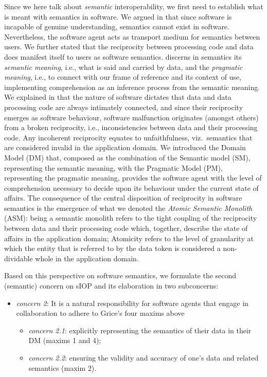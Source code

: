 \documentclass[sort&compress,preprint,authoryear,3p,twocolumn]{elsarticle}
\providecommand{\tightlist}{%
  \setlength{\itemsep}{0pt}\setlength{\parskip}{0pt}}
\begin{document}
Since we here talk about \emph{semantic} interoperability, we first need
to establish what is meant with semantics in software. We argued in
\citep{Brandt2021a} that since software is incapable of genuine
understanding, semantics cannot exist in software. Nevertheless, the
software agent acts as transport medium for semantics between users. We
further stated that the reciprocity between processing code and data
does manifest itself to users as software semantics.
\citep{Grice:1991BT} discerns in semantics its \emph{semantic meaning},
i.e., what is said and carried by data, and the \emph{pragmatic
meaning}, i.e., to connect with our frame of reference and its context
of use, implementing comprehension as an inference process from the
semantic meaning. We explained in \citep{Brandt2021a} that the nature of
software dictates that data and data processing code are always
intimately connected, and since their reciprocity emerges as software
behaviour, software malfunction originates (amongst others) from a
broken reciprocity, i.e., inconsistencies between data and their
processing code. Any incoherent reciprocity equates to unfaithfulness,
viz.~semantics that are considered invalid in the application domain. We
introduced the Domain Model (DM) that, composed as the combination of
the Semantic model (SM), representing the semantic meaning, with the
Pragmatic Model (PM), representing the pragmatic meaning, provides the
software agent with the level of comprehension necessary to decide upon
its behaviour under the current state of affairs. The consequence of the
central disposition of reciprocity in software semantics is the
emergence of what we denoted the \emph{Atomic Semantic Monolith} (ASM):
being a semantic monolith refers to the tight coupling of the
reciprocity between data and their processing code which, together,
describe the state of affairs in the application domain; Atomicity
refers to the level of granularity at which the entity that is referred
to by the data token is considered a non-dividable whole in the
application domain.

Based on this perspective on software semantics, we formulate the second
(semantic) concern on sIOP and its elaboration in two subconcerns:

\begin{itemize}
\tightlist
\item
  \emph{concern 2}: It is a natural responsibility for software agents
  that engage in collaboration to adhere to Grice's four maxims above

  \begin{itemize}
  \tightlist
  \item
    \emph{concern 2.1}: explicitly representing the semantics of their
    data in their DM (maxims 1 and 4);
  \item
    \emph{concern 2.2}: ensuring the validity and accuracy of one's data
    and related semantics (maxim 2).
  \end{itemize}
\end{itemize}
\end{document}

